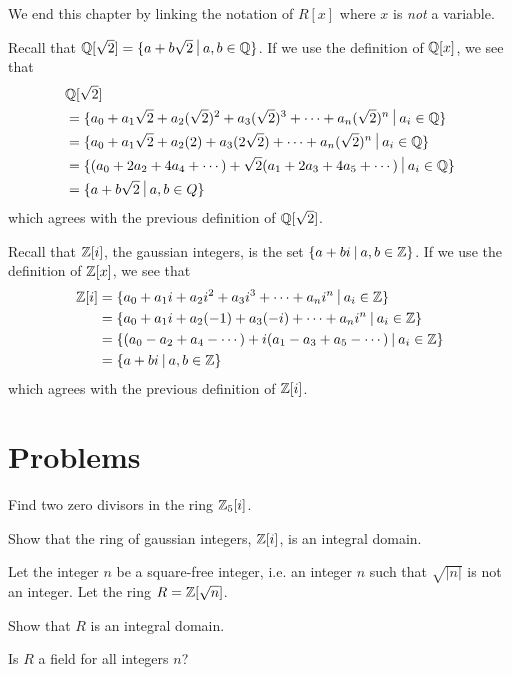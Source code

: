 We end this chapter by linking the notation of $R[x]$ where $x$ is \textit{not} a variable.
\begin{example}
    Recall that $\Q[\sqrt2] = \{a + b\sqrt2 \vert a,b \in \Q\}$. If we use the definition of $\mathbb{Q}[x]$, we see that
    \begin{align*}
        &\Q[\sqrt2] \\
        &= \{a_0 + a_1\sqrt2 + a_2(\sqrt2)^2 + a_3(\sqrt2)^3 + \cdots + a_n(\sqrt2)^n \vert a_i \in \Q \}\\
        &= \{a_0 + a_1\sqrt2 + a_2(2) + a_3(2\sqrt2) + \cdots + a_n(\sqrt2)^n \vert a_i \in \Q \}\\
        &= \{(a_0 + 2a_2 + 4a_4 + \cdots) + \sqrt2 (a_1 + 2a_3 + 4a_5 + \cdots) \vert a_i \in \Q\}\\
        &= \{a + b\sqrt2 \vert a,b \in Q\}
    \end{align*}
    which agrees with the previous definition of $\mathbb{Q}[\sqrt2]$.
\end{example}
\begin{example}
    Recall that $\mathbb{Z}[i]$, the gaussian integers, is the set $\{a+bi \vert a,b \in \Z\}$. If we use the definition of $\mathbb{Z}[x]$, we see that
    \begin{align*}
        \Z[i] &= \{a_0 + a_1i + a_2i^2 + a_3i^3 + \cdots + a_ni^n \vert a_i \in \Z\}\\
        &= \{a_0 + a_1i + a_2(-1) + a_3(-i) + \cdots + a_ni^n \vert a_i \in \Z\}\\
        &= \{(a_0 - a_2 + a_4 - \cdots) + i(a_1 - a_3 + a_5 - \cdots) \vert a_i \in \Z\}\\
        &= \{a + bi \vert a,b \in \Z\}
    \end{align*}
    which agrees with the previous definition of $\mathbb{Z}[i]$.
\end{example}

\newpage
\section{Problems}
\begin{problem}
    Find two zero divisors in the ring $\mathbb{Z}_5[i]$.
\end{problem}

\begin{problem}
    Show that the ring of gaussian integers, $\mathbb{Z}[i]$, is an integral domain.
\end{problem}

\begin{problem}
    Let the integer $n$ be a square-free integer, i.e. an integer $n$ such that $\sqrt{|n|}$ is not an integer. Let the ring $R = \mathbb{Z}[\sqrt{n}]$.
    \begin{partquestions}{\alph*}
        \item Show that $R$ is an integral domain.
        \item Is $R$ a field for all integers $n$?
    \end{partquestions}
\end{problem}

